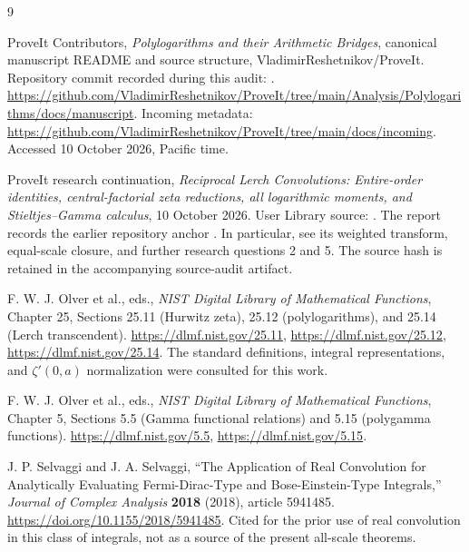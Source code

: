 \begingroup
\raggedright
\begin{thebibliography}{9}
ProveIt Contributors,
\emph{Polylogarithms and their Arithmetic Bridges}, canonical manuscript
README and source structure, VladimirReshetnikov/ProveIt.
Repository commit recorded during this audit:
.
\url{https://github.com/VladimirReshetnikov/ProveIt/tree/main/Analysis/Polylogarithms/docs/manuscript}.
Incoming metadata:
\url{https://github.com/VladimirReshetnikov/ProveIt/tree/main/docs/incoming}.
Accessed 10 October 2026, Pacific time.

ProveIt research continuation,
\emph{Reciprocal Lerch Convolutions: Entire-order identities,
central-factorial zeta reductions, all logarithmic moments, and
Stieltjes--Gamma calculus}, 10 October 2026.
User Library source:
.
The report records the earlier repository anchor
.
In particular, see its weighted transform, equal-scale closure, and
further research questions 2 and 5. The source hash is retained in the
accompanying source-audit artifact.

F. W. J. Olver et al., eds.,
\emph{NIST Digital Library of Mathematical Functions}, Chapter 25,
Sections 25.11 (Hurwitz zeta), 25.12 (polylogarithms), and 25.14
(Lerch transcendent).
\url{https://dlmf.nist.gov/25.11},
\url{https://dlmf.nist.gov/25.12},
\url{https://dlmf.nist.gov/25.14}.
The standard definitions, integral representations, and
$\zeta'(0,a)$ normalization were consulted for this work.

F. W. J. Olver et al., eds.,
\emph{NIST Digital Library of Mathematical Functions}, Chapter 5,
Sections 5.5 (Gamma functional relations) and 5.15 (polygamma functions).
\url{https://dlmf.nist.gov/5.5},
\url{https://dlmf.nist.gov/5.15}.

J. P. Selvaggi and J. A. Selvaggi,
``The Application of Real Convolution for Analytically Evaluating
Fermi-Dirac-Type and Bose-Einstein-Type Integrals,''
\emph{Journal of Complex Analysis} \textbf{2018} (2018), article 5941485.
\url{https://doi.org/10.1155/2018/5941485}.
Cited for the prior use of real convolution in this class of integrals,
not as a source of the present all-scale theorems.
\end{thebibliography}
\endgroup
